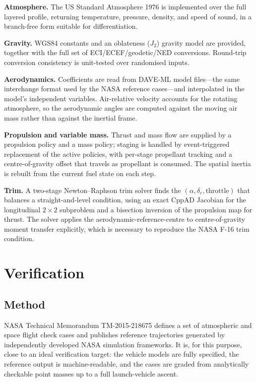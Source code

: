 \documentclass[a4paper,10pt]{article}
\theoremstyle{definition}
\begin{document}
\textbf{Atmosphere.}  The US Standard Atmosphere 1976 is implemented over the
full layered profile, returning temperature, pressure, density, and speed of
sound, in a branch-free form suitable for differentiation.

\textbf{Gravity.}  WGS84 constants and an oblateness ($J_2$) gravity model are
provided, together with the full set of ECI/ECEF/geodetic/NED conversions.
Round-trip conversion consistency is unit-tested over randomised inputs.

\textbf{Aerodynamics.}  Coefficients are read from DAVE-ML
\citep{jackson2002daveml} model files---the same interchange format used by
the NASA reference cases---and interpolated in the model's independent
variables.  Air-relative velocity accounts for the rotating atmosphere, so the
aerodynamic angles are computed against the moving air mass rather than
against the inertial frame.

\textbf{Propulsion and variable mass.}  Thrust and mass flow are supplied by a
propulsion policy and a mass policy; staging is handled by event-triggered
replacement of the active policies, with per-stage propellant tracking and a
centre-of-gravity offset that travels as propellant is consumed.  The spatial
inertia is rebuilt from the current fuel state on each step.

\textbf{Trim.}  A two-stage Newton--Raphson trim solver finds the
$(\alpha, \delta_e, \text{throttle})$ that balances a straight-and-level
condition, using an exact CppAD Jacobian for the longitudinal $2\times2$
subproblem and a bisection inversion of the propulsion map for thrust.  The
solver applies the aerodynamic-reference-centre to centre-of-gravity moment
transfer explicitly, which is necessary to reproduce the NASA F-16 trim
condition.

\section{Verification}
\label{sec:verification}

\subsection{Method}

NASA Technical Memorandum TM-2015-218675 \citep{NASA_TM_2015_218675} defines a
set of atmospheric and space flight check cases and publishes reference
trajectories generated by independently developed NASA simulation frameworks.
It is, for this purpose, close to an ideal verification target: the vehicle
models are fully specified, the reference output is machine-readable, and the
cases are graded from analytically checkable point masses up to a full
launch-vehicle ascent.
\end{document}
